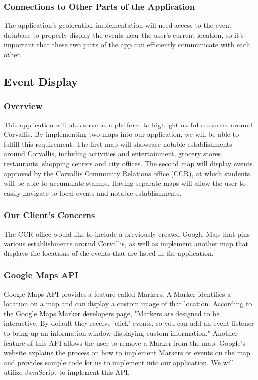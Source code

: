 \documentclass[draftclsnofoot, onecolumn, 10pt, compsoc]{IEEEtran}
\begin{document}
			\subsubsection{Connections to Other Parts of the Application}
				The application's geolocation implementation will need access to the event database to properly display the events near the user's current location, so it's important that these two parts of the app can efficiently communicate with each other.
				
		\subsection{Event Display}
			\subsubsection{Overview}
				This application will also serve as a platform to highlight useful resources around Corvallis. By implementing two maps into our application, we will be able to fulfill this requirement. The first map will showcase notable establishments around Corvallis, including activities and entertainment, grocery stores, restaurants, shopping centers and city offices. The second map will display events approved by the Corvallis Community Relations office (CCR), at which students will be able to accumulate stamps. Having separate maps will allow the user to easily navigate to local events and notable establishments. 
			\subsubsection{Our Client's Concerns}
				The CCR office would like to include a previously created Google Map that pins various establishments around Corvallis, as well as implement another map that displays the locations of the events that are listed in the application. 
			\subsubsection{Google Maps API}
				Google Maps API provides a feature called Markers. A Marker identifies a location on a map and can display a custom image of that location. According to the Google Maps Marker developers page, "Markers are designed to be interactive. By default they receive 'click' events, so you can add an event listener to bring up an information window displaying custom information." Another feature of this API allows the user to remove a Marker from the map. Google's website explains the process on how to implement Markers or events on the map and provides sample code for us to implement into our application. We will utilize JavaScript to implement this API.
				~\cite{GoogleMap}
\end{document}
